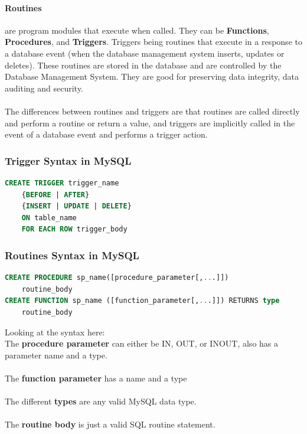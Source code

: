\documentclass[12pt]{article}
\begin{document}
\paragraph{Routines} are program modules that execute when called. They can be \textbf{Functions}, \textbf{Procedures}, and \textbf{Triggers}. Triggers being routines that execute in a response to a database event (when the database management system inserts, updates or deletes). These routines are stored in the database and are controlled by the Database Management System. They are good for preserving data integrity, data auditing and security.\\
\\
The differences between routines and triggers are that routines are called directly and perform a routine or return a value, and triggers are implicitly called in the event of a database event and performs a trigger action.

\subsubsection{Trigger Syntax in MySQL}

\begin{lstlisting}[language=SQL]
CREATE TRIGGER trigger_name
	{BEFORE | AFTER}
	{INSERT | UPDATE | DELETE}
	ON table_name
	FOR EACH ROW trigger_body
\end{lstlisting}

\subsubsection{Routines Syntax in MySQL}

\begin{lstlisting}[language=SQL]
CREATE PROCEDURE sp_name([procedure_parameter[,...]])
	routine_body
CREATE FUNCTION sp_name ([function_parameter[,...]]) RETURNS type
	routine_body
\end{lstlisting}

Looking at the syntax here:\\
The \textbf{procedure parameter} can either be IN, OUT, or INOUT, also has a parameter name and a type.\\
\\
The \textbf{function parameter} has a name and a type\\
\\
The different \textbf{types} are any valid MySQL data type.\\
\\
The \textbf{routine body} is just a valid SQL routine statement.
\end{document}
